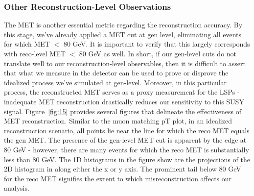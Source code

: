 \documentclass{article}
\begin{document}
\subsubsection{Other Reconstruction-Level Observations}
The MET is another essential metric regarding the reconstruction accuracy. By this stage, we've already applied a MET cut at gen level, eliminating all events for which MET $<$ 80 GeV. It is important to verify that this largely corresponds with reco-level MET $<$ 80 GeV as well. In short, if our gen-level cuts do not translate well to our reconstruction-level observables, then it is difficult to assert that what we measure in the detector can be used to prove or disprove the idealized process we've simulated at gen-level. Moreover, in this particular process, the reconstructed MET serves as a proxy measurement for the LSPs - inadequate MET reconstruction drastically reduces our sensitivity to this SUSY signal. Figure~\ref{fig:15} provides several figures that delineate the effectiveness of MET reconstruction. Similar to the muon matching pT plot, in an idealized reconstruction scenario, all points lie near the line for which the reco MET equals the gen MET. The presence of the gen-level MET cut is apparent by the edge at 80 GeV - however, there are many events for which the reco MET is substantially less than 80 GeV. The 1D histograms in the figure show are the projections of the 2D histogram in along either the x or y axis. The prominent tail below 80 GeV for the reco MET signifies the extent to which misreconstruction affects our analysis.
\par
\end{document}

